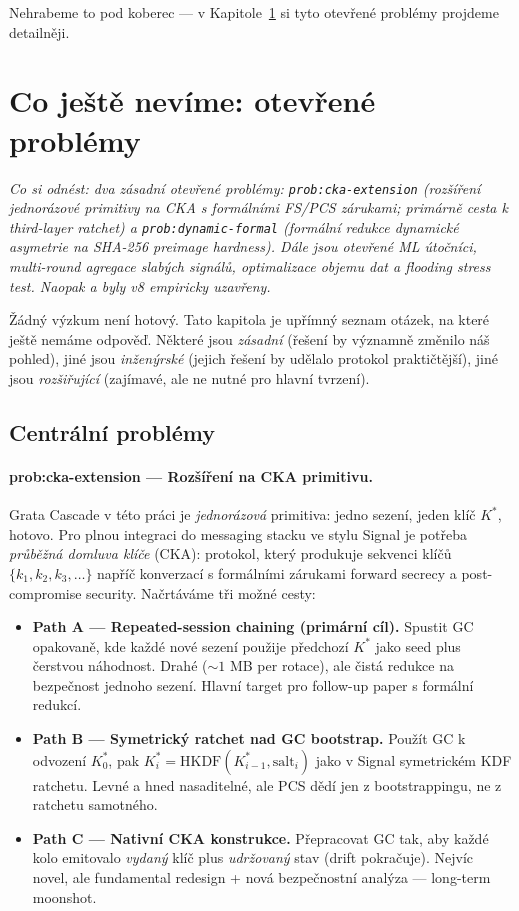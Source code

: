 \documentclass[11pt,a4paper]{article}
\begin{document}
Nehrabeme to pod koberec --- v Kapitole~\ref{pop:open} si tyto otevřené problémy projdeme detailněji.

\section{Co ještě nevíme: otevřené problémy}\label{pop:open}

\noindent\textit{Co si odnést: dva zásadní otevřené problémy: \texttt{prob:cka-extension} (rozšíření jednorázové primitivy na CKA s formálními FS/PCS zárukami; primárně cesta k third-layer ratchet) a \texttt{prob:dynamic-formal} (formální redukce dynamické asymetrie na SHA-256 preimage hardness). Dále jsou otevřené ML útočníci, multi-round agregace slabých signálů, optimalizace objemu dat a flooding stress test. Naopak \mbox{} a \mbox{} byly v8 empiricky uzavřeny.}

\medskip

Žádný výzkum není hotový. Tato kapitola je upřímný seznam otázek, na které ještě nemáme odpověď. Některé jsou \emph{zásadní} (řešení by významně změnilo náš pohled), jiné jsou \emph{inženýrské} (jejich řešení by udělalo protokol praktičtější), jiné jsou \emph{rozšiřující} (zajímavé, ale ne nutné pro hlavní tvrzení).

\subsection{Centrální problémy}

\paragraph{prob:cka-extension --- Rozšíření na CKA primitivu.} Grata Cascade v této práci je \emph{jednorázová} primitiva: jedno sezení, jeden klíč $K^*$, hotovo. Pro plnou integraci do messaging stacku ve stylu Signal je potřeba \emph{průběžná domluva klíče} (CKA): protokol, který produkuje sekvenci klíčů $\{k_1, k_2, k_3, \ldots\}$ napříč konverzací s formálními zárukami forward secrecy a post-compromise security. Načrtáváme tři možné cesty:

\begin{itemize}[leftmargin=*]
\item \textbf{Path A --- Repeated-session chaining (primární cíl).} Spustit GC opakovaně, kde každé nové sezení použije předchozí $K^*$ jako seed plus čerstvou náhodnost. Drahé ($\sim 1$ MB per rotace), ale čistá redukce na bezpečnost jednoho sezení. Hlavní target pro follow-up paper s formální redukcí.
\item \textbf{Path B --- Symetrický ratchet nad GC bootstrap.} Použít GC k odvození $K^*_0$, pak $K^*_i = \mathrm{HKDF}(K^*_{i-1}, \mathrm{salt}_i)$ jako v Signal symetrickém KDF ratchetu. Levné a hned nasaditelné, ale PCS dědí jen z bootstrappingu, ne z ratchetu samotného.
\item \textbf{Path C --- Nativní CKA konstrukce.} Přepracovat GC tak, aby každé kolo emitovalo \emph{vydaný} klíč plus \emph{udržovaný} stav (drift pokračuje). Nejvíc novel, ale fundamental redesign + nová bezpečnostní analýza --- long-term moonshot.
\end{itemize}
\end{document}
